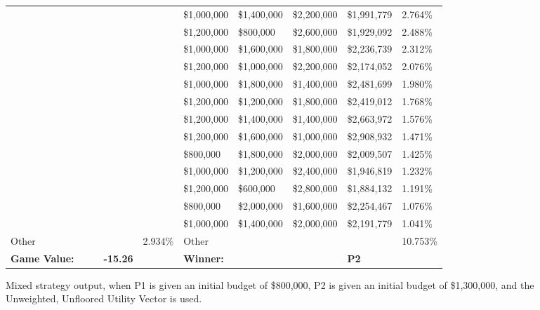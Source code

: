 \documentclass[11pt]{article}
\begin{document}
\begin{figure}
\begin{tabular}{ |p{1.0cm}p{1.0cm}p{1.0cm}p{2.0cm}|p{1.0cm}||p{1.0cm}p{1.0cm}p{1.0cm}p{2.0cm}|p{1.0cm}|}
& & & & & \$1,000,000 & \$1,400,000 & \$2,200,000 & \$1,991,779 & 2.764\% \\
& & & & & \$1,200,000 & \$800,000 & \$2,600,000 & \$1,929,092 & 2.488\% \\
& & & & & \$1,000,000 & \$1,600,000 & \$1,800,000 & \$2,236,739 & 2.312\% \\
& & & & & \$1,200,000 & \$1,000,000 & \$2,200,000 & \$2,174,052 & 2.076\% \\
& & & & & \$1,000,000 & \$1,800,000 & \$1,400,000 & \$2,481,699 & 1.980\% \\
& & & & & \$1,200,000 & \$1,200,000 & \$1,800,000 & \$2,419,012 & 1.768\% \\
& & & & & \$1,200,000 & \$1,400,000 & \$1,400,000 & \$2,663,972 & 1.576\% \\
& & & & & \$1,200,000 & \$1,600,000 & \$1,000,000 & \$2,908,932 & 1.471\% \\
& & & & & \$800,000 & \$1,800,000 & \$2,000,000 & \$2,009,507 & 1.425\% \\
& & & & & \$1,000,000 & \$1,200,000 & \$2,400,000 & \$1,946,819 & 1.232\% \\
& & & & & \$1,200,000 & \$600,000 & \$2,800,000 & \$1,884,132 & 1.191\% \\
& & & & & \$800,000 & \$2,000,000 & \$1,600,000 & \$2,254,467 & 1.076\% \\
& & & & & \$1,000,000 & \$1,400,000 & \$2,000,000 & \$2,191,779 & 1.041\% \\
\hline
Other& & & & 2.934\% & Other& & & & 10.753\% \\
\hline
\small \textbf{Game Value:} &&& \small \textbf{-15.26} && \small \textbf{Winner:} &&& \small \textbf{P2}&\\
\hline
\end{tabular}
\caption{Mixed strategy output, when P1 is given an initial budget of \$800,000, P2 is given an initial budget of \$1,300,000, and the Unweighted, Unfloored Utility Vector is used.}
\label{8v13table.4}
\end{figure}
\end{document}

